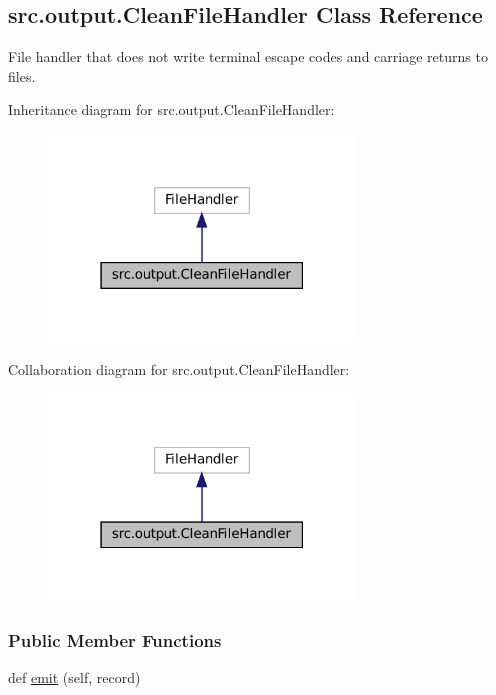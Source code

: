 \hypertarget{classsrc_1_1output_1_1CleanFileHandler}{}\subsection{src.\+output.\+Clean\+File\+Handler Class Reference}
\label{classsrc_1_1output_1_1CleanFileHandler}


File handler that does not write terminal escape codes and carriage returns to files.  




Inheritance diagram for src.\+output.\+Clean\+File\+Handler\+:
\nopagebreak
\begin{figure}[H]
\begin{center}
\leavevmode
\includegraphics[width=231pt]{classsrc_1_1output_1_1CleanFileHandler__inherit__graph}
\end{center}
\end{figure}


Collaboration diagram for src.\+output.\+Clean\+File\+Handler\+:
\nopagebreak
\begin{figure}[H]
\begin{center}
\leavevmode
\includegraphics[width=231pt]{classsrc_1_1output_1_1CleanFileHandler__coll__graph}
\end{center}
\end{figure}
\subsubsection*{Public Member Functions}
\begin{DoxyCompactItemize}
\item 
def \hyperlink{classsrc_1_1output_1_1CleanFileHandler_a5160ea5727832e846f4033f084b753e4}{emit} (self, record)
\end{DoxyCompactItemize}


